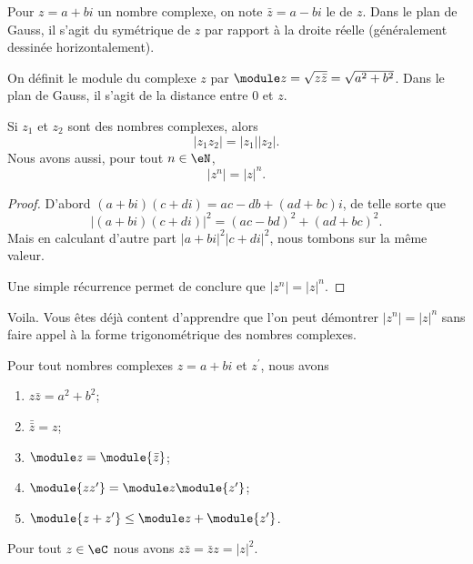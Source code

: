  Pour $z = a + bi$ un nombre complexe, on note $\bar z = a - bi$ le
  de $z$. Dans le plan de Gauss, il s'agit du
 symétrique de $z$ par rapport à la droite réelle (généralement
 dessinée horizontalement).

 On définit le module du complexe $z$ par $\module z = \sqrt{z\bar z} =
 \sqrt{a^2 + b^2}$. Dans le plan de Gauss, il s'agit de la distance
 entre $0$ et $z$.
\begin{proposition} \label{PROPooXLARooYSDCsF}
 Si \( z_1\) et \( z_2\) sont des nombres complexes, alors 
 \begin{equation}
     | z_1z_2 |=| z_1 | |z_2 |.
 \end{equation}
 Nous avons aussi, pour tout \( n\in \eN\),
 \begin{equation}
     | z^n |=| z |^n.
 \end{equation}
\end{proposition}

\begin{proof}
    D'abord \( (a+bi)(c+di)=ac-db+(ad+bc)i\), de telle sorte que
    \begin{equation}
        | (a+bi)(c+di) |^2=(ac-bd)^2+(ad+bc)^2.
    \end{equation}
    Mais en calculant d'autre part \( | a+bi |^2| c+di |^2\), nous tombons sur la même valeur.

    Une simple récurrence permet de conclure que \( | z^n |=| z |^n\).
\end{proof}
Voila. Vous êtes déjà content d'apprendre que l'on peut démontrer \( | z^n |=| z |^n\) sans faire appel à la forme trigonométrique des nombres complexes.


\begin{proposition}     \label{PROPooUMVGooIrhZZg}
Pour tout nombres complexes $z = a+bi$ et $z^\prime$, nous avons
   \begin{enumerate}
   \item $z \bar z = a^2 + b^2$;
   \item $\bar{\bar{z}} = z$;
   \item $\module z = \module {\bar z}$;
   \item $\module{zz^\prime} = \module z \module{z^\prime}$;
   \item    \label{ITEMooDVMDooFDmOur}
       $\module{z+z^\prime} \leq \module z + \module{z^\prime}$.
   \end{enumerate}
\end{proposition}

\begin{lemma}   \label{LEMooONLNooXLNbtB}
    Pour tout \( z\in \eC\) nous avons \( z\bar z=\bar z z=| z |^2\).
\end{lemma}
